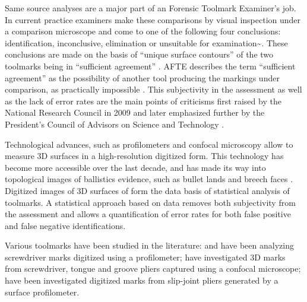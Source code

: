 \documentclass[12pt]{article}
\begin{document}
Same source analyses are a major part of an Forensic Toolmark Examiner's
job. In current practice examiners make these comparisons by visual
inspection under a comparison microscope and come to one of the
following four conclusions: identification, inconclusive, elimination or
unsuitable for examination\textasciitilde{}\citep{afte-toolmarks1998}.
These conclusions are made on the basis of ``unique surface contours''
of the two toolmarks being in ``sufficient agreement''
\citep{afte-toolmarks1998}. AFTE describes the term ``sufficient
agreement'' as the possibility of another tool producing the markings
under comparison, as practically impossible \citep{afte-toolmarks1998}.
This subjectivity in the assessment as well as the lack of error rates
are the main points of criticisms first raised by the National Research
Council in 2009 \citep{NAS:2009} and later emphasized further by the
President's Council of Advisors on Science and Technology
\citep{pcast2016}.

Technological advances, such as profilometers and confocal microscopy
allow to measure 3D surfaces in a high-resolution digitized form. This
technology has become more accessible over the last decade, and has made
its way into topological images of ballistics evidence, such as bullet
lands and breech faces
\citep{DeKinder1, DeKinder2, Bachrach1, vorburger2016}. Digitized images
of 3D surfaces of form the data basis of statistical analysis of
toolmarks. A statistical approach based on data removes both
subjectivity from the assessment and allows a quantification of error
rates for both false positive and false negative identifications.

Various toolmarks have been studied in the literature:
\citet{manytoolmarks1} and \citet{chumbley} have been analyzing
screwdriver marks digitized using a profilometer; \citet{manytoolmarks2}
have investigated 3D marks from screwdriver, tongue and groove pliers
captured using a confocal microscope; \citet{afte-chumbley} have been
investigated digitized marks from slip-joint pliers generated by a
surface profilometer.
\end{document}
